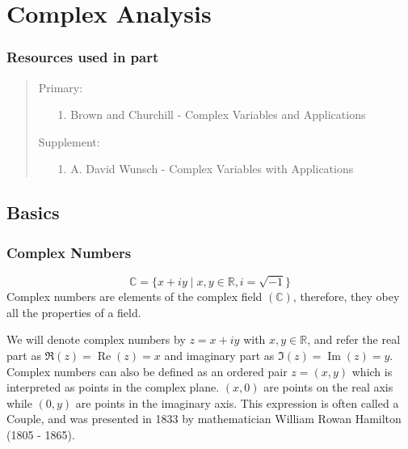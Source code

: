 \documentclass[12pt, english]{book}
\newenvironment{partintro}
{\vspace*{\fill}
	\section*{\centering Resources used in part \thepart}
	\begin{quotation}}
	{\end{quotation}\vspace*{\fill}\newpage}
\begin{document}
	\part{Complex Analysis} \label{Complex Analysis Part}
	\begin{partintro}
	\noindent Primary:
		\begin{itemize}
			\item[1.] Brown and Churchill - Complex Variables and Applications \cite{Brown.J;Churchill.R-Complex-Variables-2014}
		\end{itemize}
		Supplement: 
		\begin{itemize}
			\item[1.] A. David Wunsch - Complex Variables with Applications \cite{Wunsh.A-Complex-Variables-2005}
		\end{itemize}
	\end{partintro}
	
	\chapter{Basics} \label{Basics Chapter - Complex}
	\section{Complex Numbers} \label{Complex Numbers Section - Complex}
	$$\mathbb{C} = \{x + iy \mid x, y \in \mathbb{R}, i = \sqrt{-1}\}$$
	Complex numbers are elements of the complex field $(\mathbb{C})$, therefore, they obey all the properties of a field. 
	
	We will denote complex numbers by $z = x + iy$ with $x, y \in \mathbb{R}$, and refer the real part as $\Re(z) = \operatorname{Re}(z) = x$ and imaginary part as $\Im(z) = \operatorname{Im}(z) = y$. Complex numbers can also be defined as an ordered pair $z = (x, y)$ which is interpreted as points in the complex plane. $(x, 0)$ are points on the real axis while $(0 , y)$ are points in the imaginary axis. This expression is often called a Couple, and was presented in 1833 by mathematician William Rowan Hamilton (1805 - 1865).
	
\end{document}
